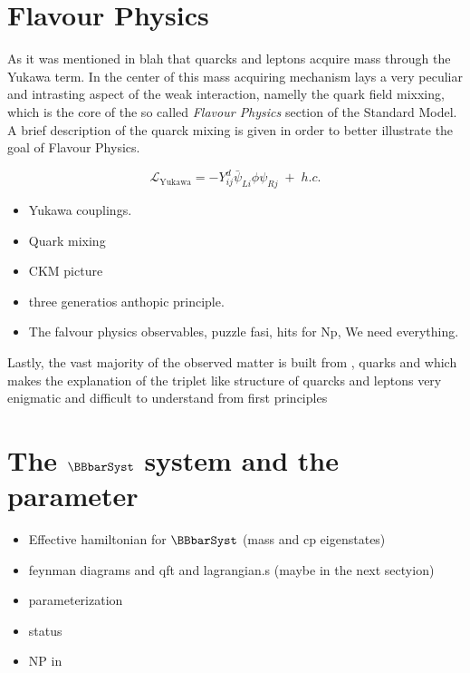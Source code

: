 \section{Flavour Physics}

As it was mentioned in blah that quarcks and leptons acquire mass through the Yukawa term.
In the center of this mass acquiring mechanism lays a very peculiar and intrasting aspect
of the weak interaction, namelly the quark field mixxing, which is the core of the so called
{\it Flavour Physics} section of the Standard Model. A brief description of the quarck mixing
is given in order to better illustrate the goal of Flavour Physics.

\begin{equation}
  \mathscr{L}_{\text{Yukawa}} = -Y_{ij}^d\bar\psi_{Li}\phi\psi_{Rj} \; + \; h.c.
\end{equation}


\begin{itemize}
  \item Yukawa couplings.
  \item Quark mixing
  \item CKM picture
  \item three generatios anthopic principle.
  \item The falvour physics observables, puzzle fasi, hits for Np, We need everything.
\end{itemize}
Lastly, the vast majority of the observed matter is built from \uquark, \dquark
    quarks and \electron which makes the explanation of the triplet like structure of quarcks and leptons very enigmatic and difficult
    to understand from first principles

\section{The $\BBbarSyst$ system and the \phis parameter}
\label{Phenomenology}

\begin{itemize}
  \item Effective hamiltonian for $\BBbarSyst$ (mass and cp eigenstates)
  \item feynman diagrams and qft and lagrangian.s (maybe in the next sectyion)
  \item \phis parameterization
  \item \phis status
  \item NP in \phis
\end{itemize}

